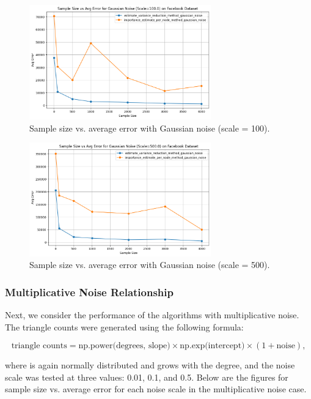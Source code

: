 \documentclass[11pt]{article}
\begin{document}
\begin{figure}[h!]
    \centering
    \includegraphics[width=0.7\textwidth]{plots/simulated/percent_error_vs_sample_size_comparison_gaussian_100.0.png}
    \caption{Sample size vs. average error with Gaussian noise (scale = 100).}
    \label{fig:gaussian_noise_100}
\end{figure}

\begin{figure}[h!]
    \centering
    \includegraphics[width=0.7\textwidth]{plots/simulated/percent_error_vs_sample_size_comparison_gaussian_500.0.png}
    \caption{Sample size vs. average error with Gaussian noise (scale = 500).}
    \label{fig:gaussian_noise_500}
\end{figure}

\subsubsection{Multiplicative Noise Relationship}

Next, we consider the performance of the algorithms with multiplicative noise. The triangle counts were generated using the following formula:

\[
\text{triangle counts} = \text{np.power(degrees, slope)} \times \text{np.exp(intercept)} \times (1 + \text{noise}),
\]

where  is again normally distributed and grows with the degree, and the noise scale was tested at three values: 0.01, 0.1, and 0.5. Below are the figures for sample size vs. average error for each noise scale in the multiplicative noise case.
\end{document}
